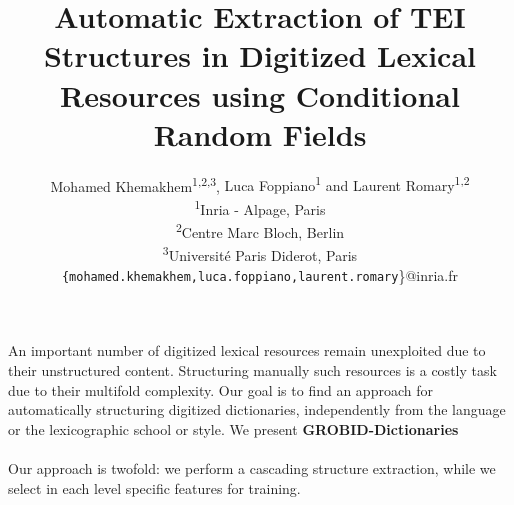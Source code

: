 \documentclass[twocolumn,a4paper]{article}
\newcommand*{\affaddr}[1]{#1} %
\newcommand*{\affmark}[1][*]{\textsuperscript{#1}}
\newcommand*{\email}[1]{\texttt{#1}}
\begin{document}
\title{Automatic Extraction of TEI Structures in Digitized Lexical Resources using Conditional Random Fields}  
\author{%
Mohamed Khemakhem\affmark[1,2,3], {Luca Foppiano\affmark[1] and Laurent Romary\affmark[1,2]\\
\affaddr{\affmark[1]Inria - Alpage, Paris}\\
\affaddr{\affmark[2]Centre Marc Bloch, Berlin}\\
\affaddr{\affmark[3]Université Paris Diderot, Paris}\\
\email{\{mohamed.khemakhem,luca.foppiano,laurent.romary}\}@inria.fr}\\
}


\paragraph{}An important number of digitized lexical resources remain unexploited due to their unstructured content. Structuring manually such resources is a costly task due to their multifold complexity. Our goal is to find an approach for automatically structuring digitized dictionaries, independently from the language or the lexicographic school or style. We present \textbf{GROBID-Dictionaries}%
 
\paragraph{} Our approach is twofold: we perform a cascading structure extraction, while we select in each level specific features for training.
\end{document}
